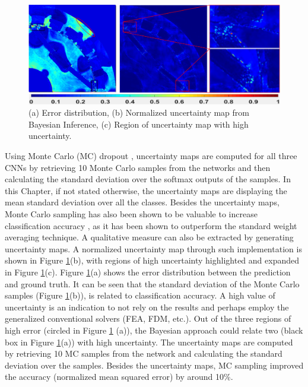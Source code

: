 \begin{figure}[h!]
    \centering
    \includegraphics[width=\textwidth]{Figures/Chp2_CNN/Fig 4_updated5.png}
    \caption{(a) Error distribution, (b) Normalized uncertainty map from Bayesian Inference, (c) Region of uncertainty map with high uncertainty.}
    \label{fig:cnn_error_analysis}
\end{figure}

Using Monte Carlo (MC) dropout \parencite{gal2016dropout}, uncertainty maps are computed for all three CNNs by retrieving 10 Monte Carlo samples from the networks and then calculating the standard deviation over the softmax outputs of the samples. In this Chapter, if not stated otherwise, the uncertainty maps are displaying the mean standard deviation over all the classes. Besides the uncertainty maps, Monte Carlo sampling has also been shown to be valuable to increase classification accuracy \parencite{kendall2015bayesian}, as it has been shown to outperform the standard weight averaging technique. A qualitative measure can also be extracted by generating uncertainty maps. A normalized uncertainty map through such implementation is shown in Figure \ref{fig:cnn_error_analysis}(b), with regions of high uncertainty highlighted and expanded in Figure \ref{fig:cnn_error_analysis}(c). Figure \ref{fig:cnn_error_analysis}(a) shows the error distribution between the prediction and ground truth. It can be seen that the standard deviation of the Monte Carlo samples (Figure \ref{fig:cnn_error_analysis}(b)), is related to classification accuracy. A high value of uncertainty is an indication to not rely on the results and perhaps employ the generalized conventional solvers (FEA, FDM, etc.).  Out of the three regions of high error (circled in Figure \ref{fig:cnn_error_analysis} (a)), the Bayesian approach could relate two (black box in Figure \ref{fig:cnn_error_analysis}(a)) with high uncertainty. The uncertainty maps are computed by retrieving 10 MC samples from the network and calculating the standard deviation over the samples. Besides the uncertainty maps, MC sampling improved the accuracy (normalized mean squared error) by around 10\%.

